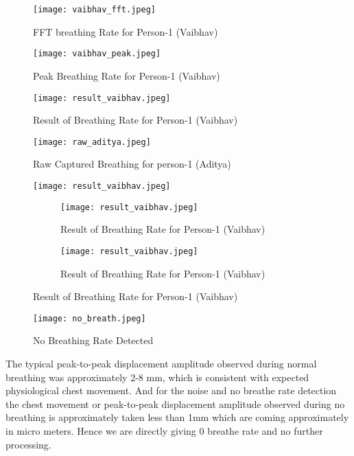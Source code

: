 \documentclass[12pt]{article}
\begin{document}
\begin{figure}[H]
\centering
\texttt{[image: vaibhav\_fft.jpeg]} %
\caption{FFT breathing Rate for Person-1 (Vaibhav)}
\end{figure}

\begin{figure}[H]
\centering
\texttt{[image: vaibhav\_peak.jpeg]} %
\caption{Peak Breathing Rate for Person-1 (Vaibhav)}
\end{figure}


\begin{figure}[H]
\centering
\texttt{[image: result\_vaibhav.jpeg]} %
\caption{Result of Breathing Rate for Person-1 (Vaibhav)}
\end{figure}

\begin{figure}[H]
\centering
\texttt{[image: raw\_aditya.jpeg]} %
\caption{Raw Captured Breathing for person-1 (Aditya)}

\end{figure}
\begin{figure}[H]
\centering
\texttt{[image: result\_vaibhav.jpeg]} %
\caption{Result of Breathing Rate for Person-1 (Vaibhav)}

\begin{figure}[H]
\centering
\texttt{[image: result\_vaibhav.jpeg]} %
\caption{Result of Breathing Rate for Person-1 (Vaibhav)}
\end{figure}
\begin{figure}[H]
\centering
\texttt{[image: result\_vaibhav.jpeg]} %
\caption{Result of Breathing Rate for Person-1 (Vaibhav)}
\end{figure}
\end{figure}
\begin{figure}[H]
\centering
\texttt{[image: no\_breath.jpeg]} %
\caption{No Breathing Rate Detected}
\end{figure}

The typical peak-to-peak displacement amplitude observed during normal breathing was approximately 2-8 mm, which is consistent with expected physiological chest movement. And for the noise and no breathe rate detection the chest movement or peak-to-peak displacement amplitude observed during no breathing is approximately taken less than 1mm which are coming approximately in micro meters. Hence we are directly giving 0 breathe rate and no further processing.
\end{document}
